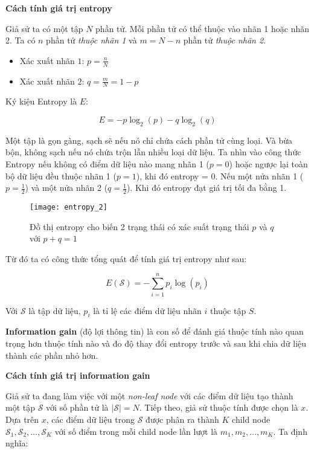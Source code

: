 \documentclass[../main-report.tex]{subfiles}
\begin{document}
\textbf{Cách tính giá trị entropy}

Giả sử ta có một tập $N$ phần tử. Mỗi phần tử có thể thuộc vào nhãn 1 hoặc nhãn 2. Ta có $n$ phần tử \emph{thuộc nhãn 1} và $m = N - n$ phần tử \emph{thuộc nhãn 2}. 

\begin{itemize}
\item Xác xuất nhãn $1$: $p = \frac{n}{N}$
\item Xác xuất nhãn $2$: $q = \frac{m}{N} = 1 - p $
\end{itemize}

Ký kiệu Entropy là $E$:

\begin{equation}
E = -p\log _2(p) - q\log _2(q)
\end{equation}

Một tập là gọn gàng, sạch sẽ nếu nó chỉ chứa cách phần tử cùng loại. Và bừa bộn, không sạch nếu nó chứa trộn lẫn nhiều loại dữ liệu. Ta nhìn vào công thức Entropy nếu không có điểm dữ liệu nào mang nhãn 1 ($p = 0$) hoặc ngược lại toàn bộ dữ liệu đều thuộc nhãn 1 ($p = 1$), khi đó entropy = 0. Nếu một nửa nhãn 1 ($p =  \frac{1}{2}$) và một nửa nhãn 2 ($ q = \frac{1}{2}$). Khi đó entropy đạt giá trị tối đa bằng 1.

\begin{figure}[ht!]
\centering\texttt{[image: entropy\_2]}
\caption[Đồ thị entropy cho biến 2 trạng thái]{Đồ thị entropy cho biến 2 trạng thái có xác suất trạng thái $p$ và $q$ với $p + q = 1$}
\label{fig:entropy_2}
\end{figure}

Từ đó ta có công thức tổng quát để tính giá trị entropy như sau:

\begin{equation}
E(\mathcal{S}) = -\sum_{i=1}^n p_i \log(p_i)
\end{equation}

Với $\mathcal{S}$ là tập dữ liệu, $p_i$ là tỉ lệ các điểm dữ liệu nhãn $i$ thuộc tập $S$.

\textbf{Information gain} (độ lợi thông tin)  là con số để đánh giá thuộc tính nào quan trọng hơn thuộc tính nào và đo độ thay đổi entropy trước và sau khi chia dữ liệu thành các phần nhỏ hơn.

\textbf{Cách tính giá trị information gain}

Giả sử ta đang làm việc với một \emph{non-leaf node} với các điểm dữ liệu tạo thành một tập \(\mathcal{S}\) với số phần tử là \(|\mathcal{S}| = N\). Tiếp theo, giả sử thuộc tính được chọn là \(x\). Dựa trên \(x\), các điểm dữ liệu trong \(\mathcal{S}\) được phân ra thành \(K\) child node \(\mathcal{S}_1, \mathcal{S}_2, \dots, \mathcal{S}_K\) với số điểm trong mỗi child node lần lượt là \(m_1, m_2, \dots, m_K\). Ta định nghĩa:
\end{document}
